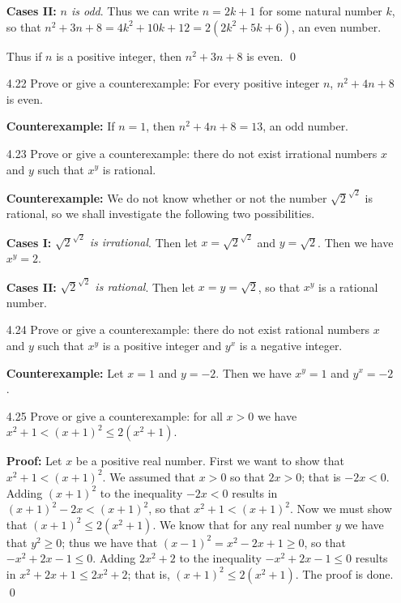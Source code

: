 \begin{enumerate}
      \textbf{Cases II:} \textit{$n$ is odd}. Thus we can write $n = 2k + 1$ for
      some natural number $k$, so that
      $n^2 + 3n + 8 = 4k^2 + 10k + 12 = 2(2k^2 + 5k + 6)$, an even number.

      Thus if $n$ is a positive integer, then $n^2 + 3n + 8$ is even. \qed
   \item[4.22] Prove or give a counterexample: For every positive integer $n$,
               $n^2 + 4n + 8$ is even.
   
      \textbf{Counterexample:} If $n = 1$, then $n^2 + 4n + 8 = 13$, an odd
      number.
   \item[4.23] Prove or give a counterexample: there do not exist irrational
               numbers $x$ and $y$ such that $x^y$ is rational.

      \textbf{Counterexample:} We do not know whether or not the number
      $\sqrt{2}^{\sqrt{2}}$ is rational, so we shall investigate the following
      two possibilities.

      \textbf{Cases I:} \textit{$\sqrt{2}^{\sqrt{2}}$ is irrational}. Then let
      $x = \sqrt{2}^{\sqrt{2}}$ and $y = \sqrt{2}$. Then we have $x^y = 2$.

      \textbf{Cases II:} \textit{$\sqrt{2}^{\sqrt{2}}$ is rational}. Then let
      $x = y = \sqrt{2}$, so that $x^y$ is a rational number.       
   \item[4.24] Prove or give a counterexample: there do not exist rational
               numbers $x$ and $y$ such that $x^y$ is a positive integer and
               $y^x$ is a negative integer.

      \textbf{Counterexample:} Let $x = 1$ and $y = -2$. Then we have
      $x^y = 1$ and $y^x = -2$.
   \item[4.25] Prove or give a counterexample: for all $x > 0$ we have
               $x^2 + 1 < (x + 1)^2 \le 2(x^2 + 1)$.

      \textbf{Proof:} Let $x$ be a positive real number. First we want to show
      that $x^2 + 1 < (x + 1)^2$. We assumed that $x > 0$ so that $2x > 0$;
      that is $-2x < 0$. Adding $(x + 1)^2$ to the inequality $-2x < 0$ results
      in $(x + 1)^2 - 2x < (x + 1)^2$, so that $x^2 + 1 < (x + 1)^2$. Now we
      must show that $(x + 1)^2 \le 2(x^2 + 1)$. We know that for any real
      number $y$ we have that $y^2 \ge 0$; thus we have that
      $(x - 1)^2 = x^2 - 2x + 1 \ge 0$, so that $-x^2 + 2x - 1 \le 0$. Adding
      $2x^2 + 2$ to the inequality $-x^2 + 2x - 1 \le 0$ results in
      $x^2 + 2x + 1 \le 2x^2 + 2$; that is, $(x + 1)^2 \le 2(x^2 + 1)$. The
      proof is done. \qed
\end{enumerate}
